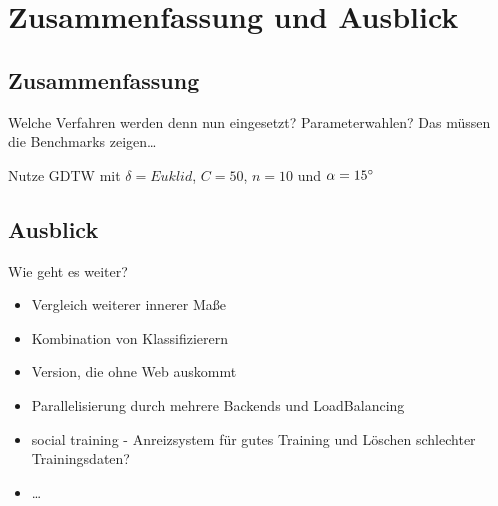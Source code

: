\chapter{Zusammenfassung und Ausblick}
\label{cha:ausblick}

\section{Zusammenfassung}

\TODO Welche Verfahren werden denn nun eingesetzt? Parameterwahlen? Das müssen die Benchmarks zeigen\dots

Nutze GDTW mit $\delta=Euklid$, $C=50$, $n=10$ und $\alpha=15\degree$

\section{Ausblick}

\TODO Wie geht es weiter?

\begin{itemize}
  \item Vergleich weiterer innerer Maße
  \item Kombination von Klassifizierern
  \item Version, die ohne Web auskommt
  \item Parallelisierung durch mehrere Backends und LoadBalancing
  \item social training - Anreizsystem für gutes Training und Löschen schlechter Trainingsdaten?
  \item \dots
\end{itemize}